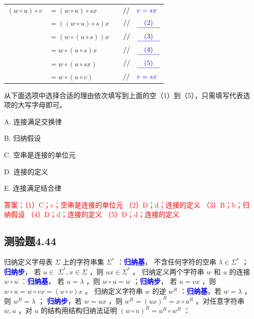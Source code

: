 \documentclass[UTF8, heading=true]{ctexart}
\begin{document}
\begin{table}[H]
  \renewcommand{\arraystretch}{1.5}
  \centering
\begin{tabular}{rlrl}
  $(w \circ u) \circ v$ & $=(w \circ u) \circ s x$ & & $/ / \quad \textcolor{blue}{v = s x}$ \\
  & $=((w \circ u) \circ s) x$ & & $/ / \quad \textcolor{blue}{\underline{\quad (2) \quad}}$ \\
  & $=(w \circ(u \circ s)) x$ & & $/ / \quad  \textcolor{blue}{\underline{\quad (3) \quad}}$ \\
  & $=w \circ(u \circ s) x$ & & $/ / \quad \textcolor{blue}{\underline{\quad (4) \quad}}$ \\
  & $=w \circ(u \circ s x)$ & & $/ / \quad \textcolor{blue}{\underline{\quad (5) \quad}}$ \\
  & $=w \circ(u \circ v)$ & & $ / / \quad \textcolor{blue}{v = s x}$
\end{tabular}
\end{table}

从下面选项中选择合适的理由依次填写到上面的空（1）到（5），只需填写代表选项的大写字母即可。

A. 连接满足交换律

B. 归纳假设

C. 空串是连接的单位元

D. 连接的定义

E. 连接满足结合律

\textcolor{red}{答案：（1）C；c；空串是连接的单位元
（2）D；d；连接的定义
（3）B；b；归纳假设
（4）D；d；连接的定义
（5）D；d；连接的定义}

\subsection{测验题4.44}

归纳定义字母表 $\Sigma$ 上的字符串集 $\Sigma^*$ ：\textcolor{blue}{\textbf{归纳基}}，
不含任何字符的空串 $\lambda \in \Sigma^*$ ；\textcolor{blue}{\textbf{归纳步}}，
若 $u \in$ $\Sigma^*, x \in \Sigma$ ，则 $u x \in \Sigma^*$ 。
归纳定义两个字符串 $w$ 和 $u$ 的连接 $w \circ u$ ：\textcolor{blue}{\textbf{归纳基}}，
若 $u=\lambda$ ，则 $w \circ u=w$ ；\textcolor{blue}{\textbf{归纳步}}，
若 $u=v x$ ，则 $w \circ u=w \circ v x=(u \circ v) x$ 。
归纳定义字符串 $w$ 的逆 $w^R$ ：\textcolor{blue}{\textbf{归纳基}}，若 $w=\lambda$ ，则 $w^R=\lambda$ ；
\textcolor{blue}{\textbf{归纳步}}，若 $w=u x$ ，则 $w^R=(u x)^R=x \circ u^R$ 。对任意字符串 $w, u$ ，对 $u$ 的结构用结构归纳法证明 $(w \circ u)^R=u^R \circ w^R$ ：
\end{document}
